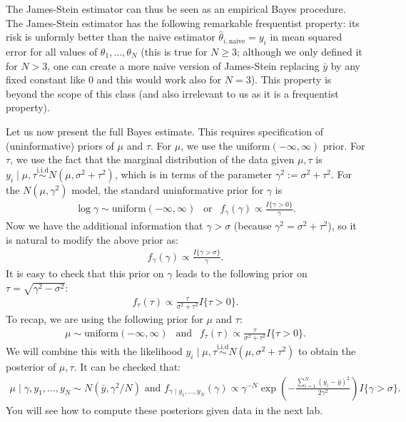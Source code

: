 \documentclass{scrartcl}
\begin{document}
The James-Stein estimator can thus be seen as an empirical Bayes
procedure. The James-Stein estimator has the following remarkable frequentist
property:  its risk is unformly better than the naive estimator
$\hat{\theta}_{i, \text{naive}} = y_i$ in mean squared error for all
values of $\theta_1, \dots, \theta_N$ (this is true for $N \geq 3$;
although we only defined it for $N > 3$, one can create a more naive
version of James-Stein replacing $\bar{y}$ by any fixed constant
like 0 and this would work also for  $N = 3$). This property is beyond
the scope of this class (and also irrelevant to us as it is a
frequentist property).

Let us now present the full Bayes estimate. This requires
specification of (uninformative) priors of $\mu$ and $\tau$. For
$\mu$, we use the $\text{uniform}(-\infty, \infty)$ prior. For $\tau$,
we use the fact that the marginal distribution of the data given $\mu,
\tau$ is $y_i \mid \mu, \tau \overset{\text{i.i.d}}{\sim} N(\mu, \sigma^2 +
\tau^2)$, which is in terms of the parameter $\gamma^2 := \sigma^2 +
\tau^2$. For the $N(\mu, \gamma^2)$ model, the standard uninformative
prior for $\gamma$ is
\begin{align*}
  \log \gamma \sim \text{uniform}(-\infty, \infty) ~~ \text{ or } ~~
  f_{\gamma}(\gamma) \propto \frac{I\{\gamma > 0\}}{\gamma}. 
\end{align*}
Now we have the additional information that $\gamma > \sigma$ (because
$\gamma^2 = \sigma^2 + \tau^2$), so it is natural to modify the above
prior as:
\begin{align*}
  f_{\gamma}(\gamma) \propto \frac{I\{\gamma > \sigma\}}{\gamma}.
\end{align*}
It is easy to check that this prior on $\gamma$ leads to the following
prior on $\tau = \sqrt{\gamma^2 - \sigma^2}$: 
\begin{align*}
  f_{\tau}(\tau) \propto \frac{\tau}{\sigma^2 + \tau^2} I\{\tau >
  0\}. 
\end{align*}
To recap, we are using the following prior for $\mu$ and $\tau$: 
\begin{align*}
  \mu \sim \text{uniform}(-\infty, \infty) ~~ \text{ and } ~~
  f_{\tau}(\tau) \propto \frac{\tau}{\sigma^2 + \tau^2} I\{\tau >
  0\}. 
\end{align*}
We will combine this with the likelihood $y_i \mid \mu, \tau
\overset{\text{i.i.d}}{\sim} N(\mu, \sigma^2 + \tau^2)$ to obtain the
posterior of $\mu, \tau$. It can be checked that:
\begin{align*}
  \mu \mid \gamma, y_1, \dots, y_N \sim N\left(\bar{y}, \gamma^2/N
  \right) \text{ and } f_{\gamma \mid y_1, \dots, y_N}(\gamma) \propto
  \gamma^{-N} \exp \left(-\frac{\sum_{i=1}^N (y_i - \bar{y})^2}{2
  \gamma^2} \right) I\{\gamma > \sigma\}. 
\end{align*}
You will see how to compute these posteriors given data in the next
lab. 
\end{document}
